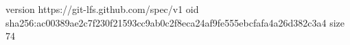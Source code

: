 version https://git-lfs.github.com/spec/v1
oid sha256:ac00389ae2c7f230f21593cc9ab0c2f8eca24af9fe555ebcfafa4a26d382c3a4
size 74
